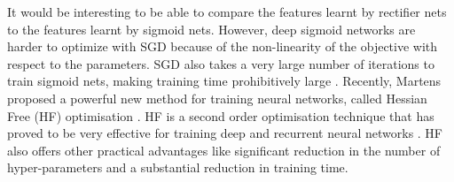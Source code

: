 \documentclass{article}
\begin{document}


It would be interesting to be able to compare the features learnt by rectifier nets to the features learnt by sigmoid nets. However, deep sigmoid networks are harder to optimize with SGD because of the non-linearity of the objective with respect to the parameters. SGD also takes a very large number of iterations to train sigmoid nets, making training time prohibitively large \cite{hamel2010learning}. Recently, Martens proposed a powerful new method for training neural networks, called Hessian Free (HF) optimisation \cite{martens2010deep}. HF is a second order optimisation technique that has proved to be very effective for training deep and recurrent neural networks \cite{martens2011learning}. HF also offers other practical advantages like significant reduction in the number of hyper-parameters and a substantial reduction in training time. 

\end{document}
